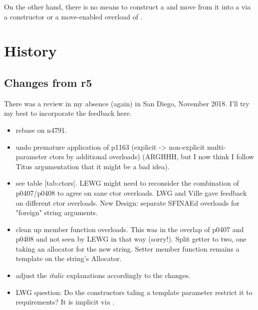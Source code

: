 \documentclass[ebook,11pt,article]{memoir}
\renewcommand{\ref}[1]{[#1]}
\begin{document}
On the other hand, there is no means to construct a  and move from it into a  via a constructor or a move-enabled overload of .

\section{History}

\subsection{Changes from r5}
There was a review in my absence (again) in San Diego, November 2018. I'll try my best to incorporate the feedback here.
\begin{itemize}
\item rebase on n4791.
\item undo premature application of p1163 (explicit -> non-explicit multi-parameter ctors by additional overloads) (ARGHHH, but I now think I follow Titus argumentation that it might be a bad idea).
\item see table \ref{tab:ctors}. LEWG might need to reconsider the combination of p0407/p0408 to agree on sane ctor overloads. LWG and Ville gave feedback on different ctor overloads. New Design: separate SFINAEd overloads for "foreign" string arguments.
\item clean up  member function overloads. This was in the overlap of p0407 and p0408 and not seen by LEWG in that way (sorry!). Split getter to two, one taking an allocator for the new string. Setter  member function remains a template on the string's Allocator. 
\item adjust the \emph{italic} explanations accordingly to the changes.
\item LWG question: Do the constructors taling a  template parameter restrict it  to  requirements? It is implicit via .

\end{itemize}
\end{document}
